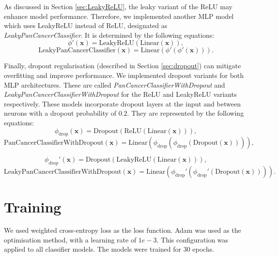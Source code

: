 \documentclass{l4proj}
\begin{document}
As discussed in Section \ref{sec:LeakyReLU}, the leaky variant of the ReLU may enhance model performance. Therefore, we implemented another MLP model which uses LeakyReLU instead of ReLU, designated as \emph{LeakyPanCancerClassifier}. It is determined by the following equations:
\begin{equation}
    \phi'(\boldsymbol{x}) = \text{LeakyReLU}(\text{Linear}(\boldsymbol{x})),
\end{equation}
\begin{equation}
    \text{LeakyPanCancerClassifier}(\boldsymbol{x}) = \text{Linear}(\phi'(\phi'(\boldsymbol{x}))).
\end{equation}

Finally, dropout regularisation (described in Section \ref{sec:dropout}) can mitigate overfitting and improve performance. We implemented dropout variants for both MLP architectures. These are called \emph{PanCancerClassifierWithDropout} and \emph{LeakyPanCancerClassifierWithDropout} for the ReLU and LeakyReLU variants respectively. These models incorporate dropout layers at the input and between neurons with a dropout probability of $0.2$. They are represented by the following equations:
\begin{equation}
    \phi_\text{drop}(\boldsymbol{x}) = \text{Dropout}(\text{ReLU}(\text{Linear}(\boldsymbol{x}))),
\end{equation}
\begin{equation}
    \text{PanCancerClassifierWithDropout}(\boldsymbol{x}) = \text{Linear}(\phi_\text{drop}(\phi_\text{drop}(\text{Dropout}(\boldsymbol{x})))),
\end{equation}

\begin{equation}
    \phi_\text{drop}'(\boldsymbol{x}) = \text{Dropout}(\text{LeakyReLU}(\text{Linear}(\boldsymbol{x}))),
\end{equation}
\begin{equation}
    \text{LeakyPanCancerClassifierWithDropout}(\boldsymbol{x}) = \text{Linear}(\phi_\text{drop}'(\phi_\text{drop}'(\text{Dropout}(\boldsymbol{x})))).
\end{equation}

\section{Training} \label{sec:WSItraining}
We used weighted cross-entropy loss as the loss function. Adam was used as the optimisation method, with a learning rate of $1e-3$. This configuration was applied to all classifier models. The models were trained for 30 epochs.
\end{document}
